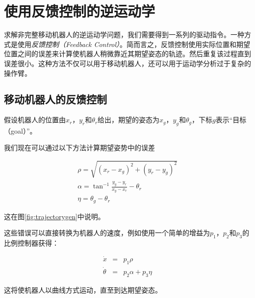 \section{使用反馈控制的逆运动学} 
\label{sec:advinvkinematics}

求解非完整移动机器人的逆运动学问题，我们需要得到一系列的驱动指令。一种方式是使用\emph{反馈控制（Feedback Control）}。简而言之，反馈控制使用实际位置和期望位置之间的误差来计算使机器人稍微靠近其期望姿态的轨迹。然后重复该过程直到误差很小。这种方法不仅可以用于移动机器人，还可以用于运动学分析过于复杂的操作臂。

\subsection {移动机器人的反馈控制} 
\label{sec:fbmobile}

假设机器人的位置由$x_r$，$y_r $和$ \theta_r $给出，期望的姿态为$ x_g$，$y_g $和$ \theta_g $，下标$ g $表示“目标（goal）”。

我们现在可以通过以下方法计算期望姿势中的误差

\begin{eqnarray}
\rho=\sqrt{(x_r-x_g)^2+(y_r-y_g)^2}\\
\nonumber
\alpha=\tan^{-1}{\frac{y_g-y_r}{x_g-x_r}}-\theta_r\\
\nonumber
\eta=\theta_g-\theta_r
\end{eqnarray}

这在图\ref{fig:trajectorygen}中说明。


这些错误可以直接转换为机器人的速度，例如使用一个简单的增益为$p_1$，$p_2$和$p_3$的比例控制器获得：

\begin{eqnarray}
\dot{x} &=& p_1 \rho\\
\dot{\theta} &=& p_2 \alpha + p_3 \eta
\end{eqnarray}

这将使机器人以曲线方式运动，直至到达期望姿态。

